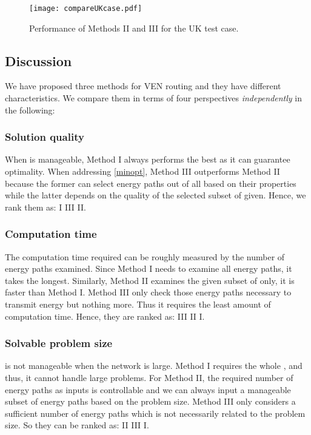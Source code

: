 \documentclass[journal]{IEEEtran}
\begin{document}
\begin{figure}[!t]
\centering
\hspace{-1.0cm}
\texttt{[image: compareUKcase.pdf]}  \vspace{-1cm}
\caption{Performance of Methods II and III for the UK test case.}
\label{fig:UKtest}
\end{figure}


\subsection{Discussion} \label{sec:discussion}
We have proposed  three methods for VEN routing and they have different characteristics. We compare them in terms of four perspectives \textit{independently} in the following:

\subsubsection{Solution quality}
When  is manageable, Method I always performs the best as it can guarantee optimality. When addressing \eqref{minopt}, Method III outperforms Method II because the former can select energy paths out of all based on their properties while the latter depends on the quality of the selected subset of  given. Hence, we rank them as: I  III  II.

\subsubsection{Computation time}
The computation time required can be roughly measured by the number of energy paths examined. Since Method I needs to examine all energy paths, it takes the longest. Similarly, Method II examines the given subset of  only, it is faster than Method I. Method III only check those energy paths necessary to transmit energy but nothing more. Thus it requires the least amount of computation time.  Hence, they are ranked as: III  II  I.

\subsubsection{Solvable problem size}
  is not manageable when the network is large. Method I requires the whole , and thus, it cannot handle large problems. For Method II, the required number of energy paths as inputs is controllable and we can always input a manageable subset of energy paths based on the problem size. Method III only considers a sufficient number of energy paths which is not necessarily related to the problem size. So they can be ranked as: II  III  I.
\end{document}
